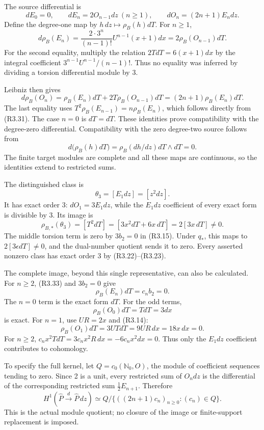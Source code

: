 \documentclass[
  10pt,
]{article}
\begin{document}
The source differential is \[
dE_0=0,\qquad dE_n=2O_{n-1}dz\ (n\ge1),\qquad
dO_n=(2n+1)E_n dz.
\tag{R3.38}
\] Define the degree-one map by \(h\,dz\mapsto\rho_B(h)dT\). For
\(n\ge1\), \[
d\rho_B(E_n)
=\frac{2\cdot3^n}{(n-1)!}U^{n-1}(x+1)dx
=2\rho_B(O_{n-1})dT.
\tag{R3.39}
\] For the second equality, multiply the relation \(2TdT=6(x+1)dx\) by
the integral coefficient \(3^{n-1}U^{n-1}/(n-1)!\). Thus no equality was
inferred by dividing a torsion differential module by 3.

Leibniz then gives \[
d\rho_B(O_n)=\rho_B(E_n)dT+2T\rho_B(O_{n-1})dT
=(2n+1)\rho_B(E_n)dT.
\] The last equality uses \(T^2\rho_B(E_{n-1})=n\rho_B(E_n)\), which
follows directly from (R3.31). The case \(n=0\) is \(dT=dT\). These
identities prove compatibility with the degree-zero differential.
Compatibility with the zero degree-two source follows from \[
d\bigl(\rho_B(h)dT\bigr)=\rho_B(dh/dz)dT\wedge dT=0.
\] The finite target modules are complete and all these maps are
continuous, so the identities extend to restricted sums.

The distinguished class is \[
\theta_3=[E_1dz]=[z^2dz].
\] It has exact order 3: \(dO_1=3E_1dz\), while the \(E_1dz\)
coefficient of every exact form is divisible by 3. Its image is \[
\rho_{B,*}(\theta_3)
=[T^2dT]=[3x^2dT+6x\,dT]
=2[3x\,dT]\ne0.
\tag{R3.40}
\] The middle torsion term is zero by \(3b_2=0\) in (R3.15). Under
\(q_*\), this maps to \(2[3\epsilon dT]\ne0\), and the dual-number
quotient sends it to zero. Every asserted nonzero class has exact order
3 by (R3.22)--(R3.23).

The complete image, beyond this single representative, can also be
calculated. For \(n\ge2\), (R3.33) and \(3b_2=0\) give \[
\rho_B(E_n)dT=c_nb_2=0.
\] The \(n=0\) term is the exact form \(dT\). For the odd terms, \[
\rho_B(O_0)dT=TdT=3dx
\] is exact. For \(n=1\), use \(UR=2x\) and (R3.14): \[
\rho_B(O_1)dT=3UTdT=9UR\,dx=18x\,dx=0.
\] For \(n\ge2\), \(c_nx^2TdT=3c_nx^2R\,dx=-6c_nx^2dx=0\). Thus only the
\(E_1dz\) coefficient contributes to cohomology.

To specify the full kernel, let \(Q=c_0(\mathbb N_0,O)\), the module of
coefficient sequences tending to zero. Since 2 is a unit, every
restricted sum of \(O_n dz\) is the differential of the corresponding
restricted sum \(\frac12 E_{n+1}\). Therefore \[
H^1(\widehat P\xrightarrow{d}\widehat P\,dz)
\simeq Q/\{((2n+1)c_n)_{n\ge0}:(c_n)\in Q\}.
\tag{R3.41}
\] This is the actual module quotient; no closure of the image or
finite-support replacement is imposed.
\end{document}
